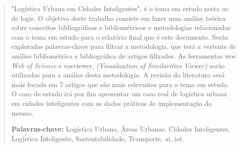 
\begin{abstract}
"Logística Urbana em Cidades Inteligentes", é o tema em estudo nesta \gls{uc} de \gls{logis}.
O objetivo deste trabalho consiste em fazer uma análise teórica sobre conceitos bibliográficos e bibliométricos e metodologias relacionadas com o tema em estudo para o relatório final que é este documento.
Serão exploradas palavras-chave para filtrar a metodologia, que terá a vertente de análise bibliométrica e bibliográfica de artigos filtrados.
As ferramentas \gls{wos} \textit{Web of Science} e \gls{vosviewer}, \textit{(Visualization of Similarities Viewer)} serão utilizadas para a análise desta metodologia.
A revisão da literatura será mais focada em 7 artigos que são mais relevantes para o tema em estudo.
O caso de estudo irá por fim apresentar um caso real de logística urbana em cidades inteligentes com os dados práticos de implementação do mesmo.



\vspace{5cm}
\textbf{Palavras-chave:}
Logística Urbana, Áreas Urbanas, Cidades Inteligentes, Logística Inteligente, Sustentabilidade, Transporte, \gls{ai}, \gls{iot}.

\end{abstract}